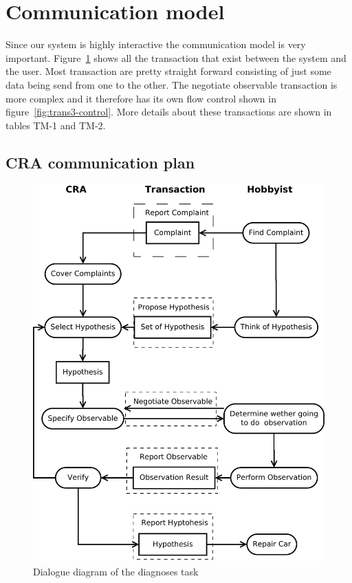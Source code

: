 \section{Communication model}
Since our system is highly interactive the communication model is very important. Figure~\ref{fig:dialogueDiagram} shows all the transaction that exist between the system and the user. Most transaction are pretty straight forward consisting of just some data being send from one to the other. The negotiate observable transaction is more complex and it therefore has its own flow control shown in figure~\ref{fig:trans3-control}. More details about these transactions are shown in tables TM-1 and TM-2.

\subsection{CRA communication plan}
\begin{figure}[htbp]
	\centering
		\includegraphics[width=1.00\textwidth]{dialogueDiagram.pdf}
	\caption{Dialogue diagram of the diagnoses task}
	\label{fig:dialogueDiagram}
\end{figure}

